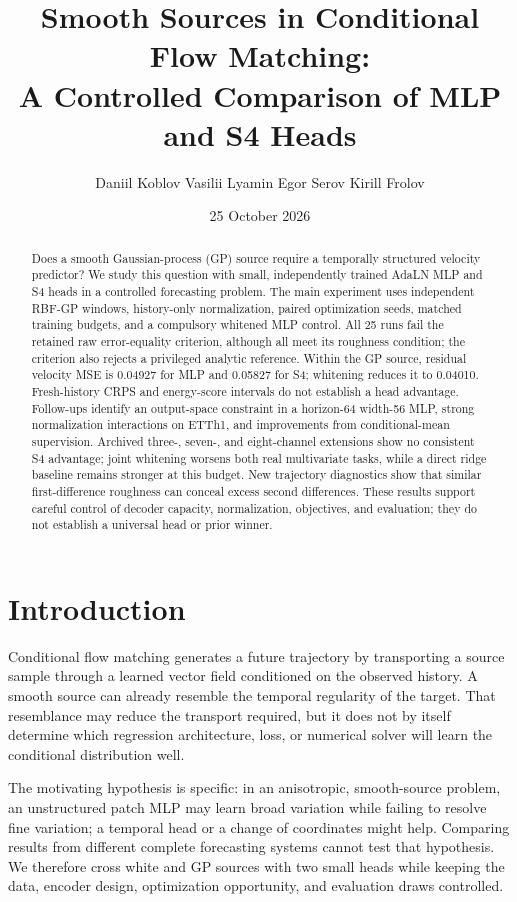 \documentclass[10pt,twocolumn]{article}
\title{Smooth Sources in Conditional Flow Matching:\\A Controlled Comparison of MLP and S4 Heads}
\author{Daniil Koblov \quad Vasilii Lyamin \quad Egor Serov \quad Kirill Frolov}
\date{25 October 2026}
\begin{document}
\maketitle
\begin{abstract}
Does a smooth Gaussian-process (GP) source require a temporally structured velocity predictor? We study this question with small, independently trained AdaLN MLP and S4 heads in a controlled forecasting problem. The main experiment uses independent RBF-GP windows, history-only normalization, paired optimization seeds, matched training budgets, and a compulsory whitened MLP control. All 25 runs fail the retained raw error-equality criterion, although all meet its roughness condition; the criterion also rejects a privileged analytic reference. Within the GP source, residual velocity MSE is 0.04927 for MLP and 0.05827 for S4; whitening reduces it to 0.04010. Fresh-history CRPS and energy-score intervals do not establish a head advantage. Follow-ups identify an output-space constraint in a horizon-64 width-56 MLP, strong normalization interactions on ETTh1, and improvements from conditional-mean supervision. Archived three-, seven-, and eight-channel extensions show no consistent S4 advantage; joint whitening worsens both real multivariate tasks, while a direct ridge baseline remains stronger at this budget. New trajectory diagnostics show that similar first-difference roughness can conceal excess second differences. These results support careful control of decoder capacity, normalization, objectives, and evaluation; they do not establish a universal head or prior winner.
\end{abstract}

\section{Introduction}
Conditional flow matching generates a future trajectory by transporting a source sample through a learned vector field conditioned on the observed history. A smooth source can already resemble the temporal regularity of the target. That resemblance may reduce the transport required, but it does not by itself determine which regression architecture, loss, or numerical solver will learn the conditional distribution well.

The motivating hypothesis is specific: in an anisotropic, smooth-source problem, an unstructured patch MLP may learn broad variation while failing to resolve fine variation; a temporal head or a change of coordinates might help. Comparing results from different complete forecasting systems cannot test that hypothesis. We therefore cross white and GP sources with two small heads while keeping the data, encoder design, optimization opportunity, and evaluation draws controlled.
\end{document}

